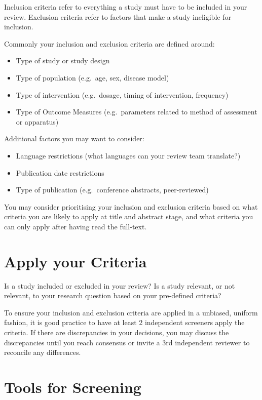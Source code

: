 \documentclass[
]{book}
\begin{document}
Inclusion criteria refer to everything a study must have to be included in your review.
Exclusion criteria refer to factors that make a study ineligible for inclusion.

Commonly your inclusion and exclusion criteria are defined around:

\begin{itemize}
\item
  Type of study or study design
\item
  Type of population (e.g.~age, sex, disease model)
\item
  Type of intervention (e.g.~dosage, timing of intervention, frequency)
\item
  Type of Outcome Measures (e.g.~parameters related to method of assessment or apparatus)
\end{itemize}

Additional factors you may want to consider:

\begin{itemize}
\item
  Language restrictions (what languages can your review team translate?)
\item
  Publication date restrictions
\item
  Type of publication (e.g.~conference abstracts, peer-reviewed)
\end{itemize}

You may consider prioritising your inclusion and exclusion criteria based on what criteria you are likely to apply at title and abstract stage, and what criteria you can only apply after having read the full-text.

\hypertarget{apply-your-criteria}{%
\section{Apply your Criteria}\label{apply-your-criteria}}

Is a study included or excluded in your review? Is a study relevant, or not relevant, to your research question based on your pre-defined criteria?

To ensure your inclusion and exclusion criteria are applied in a unbiased, uniform fashion, it is good practice to have at least 2 independent screeners apply the criteria. If there are discrepancies in your decisions, you may discuss the discrepancies until you reach consensus or invite a 3rd independent reviewer to reconcile any differences.

\hypertarget{tools-for-screening}{%
\section{Tools for Screening}\label{tools-for-screening}}
\end{document}
